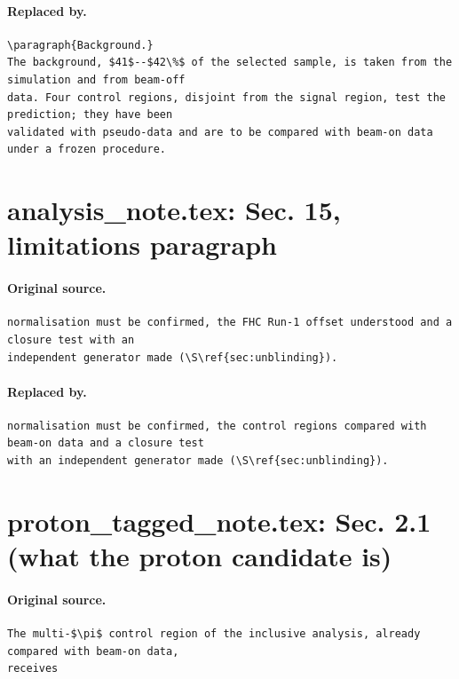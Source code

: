 \documentclass[11pt,a4paper]{article}
\begin{document}
\paragraph{Replaced by.}
\begin{lstlisting}[language={[LaTeX]TeX},basicstyle=\ttfamily\footnotesize,columns=fullflexible]
\paragraph{Background.}
The background, $41$--$42\%$ of the selected sample, is taken from the simulation and from beam-off
data. Four control regions, disjoint from the signal region, test the prediction; they have been
validated with pseudo-data and are to be compared with beam-on data under a frozen procedure.
\end{lstlisting}

\section{analysis\_note.tex: Sec. 15, limitations paragraph}
\paragraph{Original source.}
\begin{lstlisting}[language={[LaTeX]TeX},basicstyle=\ttfamily\footnotesize,columns=fullflexible]
normalisation must be confirmed, the FHC Run-1 offset understood and a closure test with an
independent generator made (\S\ref{sec:unblinding}).
\end{lstlisting}
\paragraph{Replaced by.}
\begin{lstlisting}[language={[LaTeX]TeX},basicstyle=\ttfamily\footnotesize,columns=fullflexible]
normalisation must be confirmed, the control regions compared with beam-on data and a closure test
with an independent generator made (\S\ref{sec:unblinding}).
\end{lstlisting}

\section{proton\_tagged\_note.tex: Sec. 2.1 (what the proton candidate is)}
\paragraph{Original source.}
\begin{lstlisting}[language={[LaTeX]TeX},basicstyle=\ttfamily\footnotesize,columns=fullflexible]
The multi-$\pi$ control region of the inclusive analysis, already compared with beam-on data,
receives
\end{lstlisting}
\end{document}
